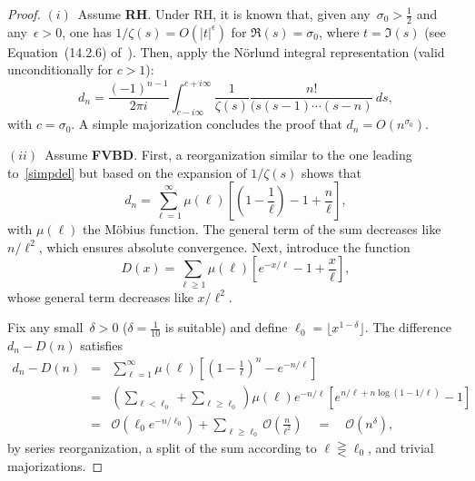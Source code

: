 \documentclass{amsart}
\def\ds{\displaystyle}
\def\O{\mathcal{O}}
\begin{document}
\begin{proof}
$(i)$~Assume {\bf RH}. Under RH, it is known that, given any~$\sigma_0>\frac12$ and any~$\epsilon>0$, 
one has $1/\zeta(s)=O(|t|^\epsilon)$ for $\Re(s)=\sigma_0$,
where $t=\Im(s)$ (see Equation~(14.2.6) of~\cite[p.~337]{Titchmarsh86}). 
Then, apply the N\"orlund integral representation (valid unconditionally for $c>1$):
\begin{equation}\label{norinv}
d_n=\frac{(-1)^{n-1}}{2\pi i}\int_{c-i\infty}^{c+i\infty}
\frac{1}{\zeta(s)} \frac{n!}{(s(s-1)\cdots(s-n)}\, ds,
\end{equation}
with $c=\sigma_0$.
A simple majorization concludes the proof  that $d_n=O(n^{\sigma_0})$.

$(ii)$~Assume {\bf FVBD}. First, a reorganization similar to the one leading to~\eqref{simpdel}
but based on the expansion of $1/\zeta(s)$ shows that
\[
d_n=\sum_{\ell=1}^\infty \mu(\ell)\left[\left(1-\frac{1}{\ell}\right)-1+\frac{n}{\ell}\right],
\]
with $\mu(\ell)$ the M\"obius function. The general term of the sum decreases like $n/\ell^2$,
which ensures absolute convergence. Next, introduce the function
\[
D(x)=\sum_{\ell\ge1} \mu(\ell)\left[e^{-x/\ell}-1+\frac{x}{\ell}\right],
\]
whose general term decreases like $x/\ell^2$. 

Fix any small~$\delta>0$ ($\delta=\frac1{10}$ is suitable) and define $\ell_0=\lfloor x^{1-\delta}\rfloor$.
The difference $d_n-D(n)$ satisfies
\begin{equation}\label{dede}
\begin{array}{lll}
 d_n-D(n) &=& \ds \sum_{\ell=1}^\infty \mu(\ell)\left[\left(1-\frac{1}{\ell}\right)^n
-e^{-n/\ell}\right]
\\
&=& \ds \left(\sum_{\ell<\ell_0}+\sum_{\ell\ge \ell_0}\right)
\mu(\ell)e^{-n/\ell}\left[e^{n/\ell+n\log(1-1/\ell)}
-1\right]
\\
&=&\ds \O\left(\ell_0 e^{-n/\ell_0}\right) +\sum_{\ell\ge\ell_0}\O\left(\frac{n}{\ell^2}\right)
 \quad = \quad\ds \O\left(n^\delta\right),
\end{array}
\end{equation}
by series reorganization, a split of the sum according to $\ell \gtreqless\ell_0$,
and trivial majorizations. 


\end{proof}
\end{document}
